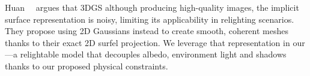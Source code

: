     Huan~\etal~\cite{huang20242d} argues that 3DGS although producing high-quality
    images, the implicit surface representation is noisy, limiting its
    applicability in relighting scenarios.
    They propose using 2D Gaussians instead to create smooth, coherent meshes
    thanks to their exact 2D surfel projection.
    We leverage that representation in our \lumigauss---a relightable model that
    decouples albedo, environment light and shadows thanks to our proposed
    physical constraints.
